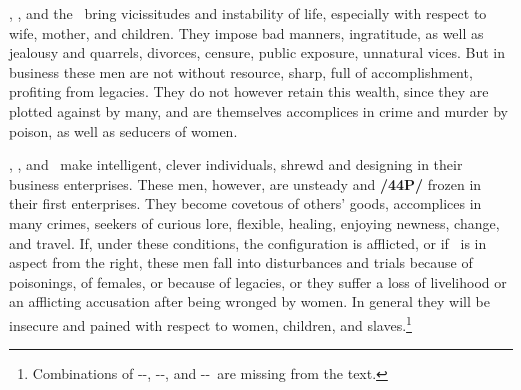\Saturn, \Venus, and the \Moon\, bring vicissitudes and instability of life, especially with respect to wife, mother, and children. They impose bad manners, ingratitude, as well as jealousy and quarrels, divorces, censure, public exposure, unnatural vices. But in business these men are not without resource, sharp, full of accomplishment, profiting from legacies. They do not however retain this wealth, since they are plotted against by many, and are themselves accomplices in crime and murder by poison, as well as seducers of women.

\Saturn, \Venus, and \Mercury\, make intelligent, clever individuals, shrewd and designing in their business enterprises. These men, however, are unsteady and \textbf{/44P/} frozen in their first enterprises. They become covetous of others’ goods, accomplices in many crimes, seekers of curious lore, flexible, healing, enjoying newness, change, and travel. If, under these conditions, the configuration is afflicted, or if \Mars\, is in aspect from the right, these men fall into disturbances and trials because of poisonings, of females, or because of legacies, or they suffer a loss of livelihood or an afflicting accusation after being wronged by women. In general they will be insecure and pained with respect to women, children, and slaves.\footnote{Combinations of \Saturn-\Mercury-\Sun, \Saturn-\Mercury-\Moon, and \Saturn-\Sun-\Moon\, are missing from the text.}

\secbr
{}
